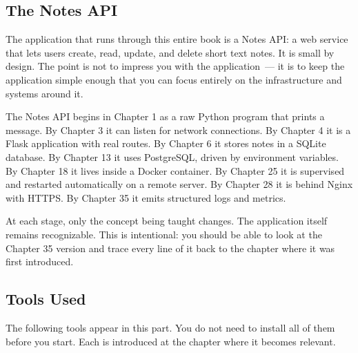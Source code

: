 \label{part4-introduction:a-note-on-examples-tools-and-the-running-project}

\subsection*{The Notes API}\label{part4-introduction:the-notes-api}

The application that runs through this entire book is a Notes API: a web service that lets users create, read, update, and delete short text notes. It is small by design. The point is not to impress you with the application~--- it is to keep the application simple enough that you can focus entirely on the infrastructure and systems around it.

The Notes API begins in Chapter 1 as a raw Python program that prints a message. By Chapter 3 it can listen for network connections. By Chapter 4 it is a Flask application with real routes. By Chapter 6 it stores notes in a SQLite database. By Chapter 13 it uses PostgreSQL, driven by environment variables. By Chapter 18 it lives inside a Docker container. By Chapter 25 it is supervised and restarted automatically on a remote server. By Chapter 28 it is behind Nginx with HTTPS. By Chapter 35 it emits structured logs and metrics.

At each stage, only the concept being taught changes. The application itself remains recognizable. This is intentional: you should be able to look at the Chapter 35 version and trace every line of it back to the chapter where it was first introduced.

\subsection*{Tools Used}\label{part4-introduction:tools-used}

The following tools appear in this part. You do not need to install all of them before you start. Each is introduced at the chapter where it becomes relevant.

